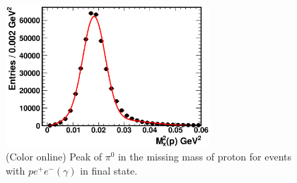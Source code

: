 \documentclass{article}
\begin{document}
\begin{figure}[htb!]
	\centerline{
		\includegraphics[width=3in, angle=0]{IGOR/pi0_peak.eps}}	
	\caption {(Color online) Peak of $\pi^0$ in the missing
		mass of proton for events with $pe^+e^-(\gamma)$
		in final state.} \label{fig:pi0_peak}
\end{figure}
\end{document}
